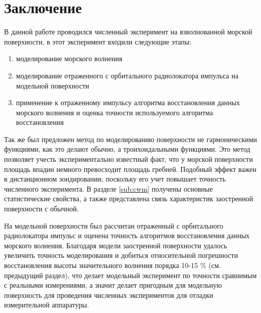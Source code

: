 \section{Заключение}%
\label{sec:zakliuchenie}

В данной работе проводился численный эксперимент на взволнованной морской
поверхности, в этот эксперимент входили следующие этапы:
\begin{enumerate}
    \item моделирование морского волнения
    \item моделирование отраженного с орбитального радиолокатора импульса на модельной поверхности
    \item применение к отраженному импульсу алгоритма восстановления данных
    морского волнения и оценка точности используемого алгоритма
    восстановления
\end{enumerate}

Так же был предложен метод по моделированию поверхности не гармоническими
функциями, как это делают обычно, а троихоидальными функциями. Это метод
позволяет учесть экспериментально известный факт, что у морской поверхности
площадь впадин немного превосходит площадь гребней. Подобный эффект важен в
дистанционном зондировании, поскольку его учет повышает точность численного
эксперимента.  В разделе \ref{sub:cwm} получены основные статистические
свойства, а также представлена связь характеристик заостренной поверхности с
обычной.


На модельной поверхности был рассчитан отраженный с орбитального радиолокатора
импульс и оценена точность алгоритмов восстановления данных морского волнения. 
Благодаря модели заостренной поверхности удалось увеличить точность
моделирования и добиться относительной погрешности восстановления высоты
значительного волнения порядка 10-15 \% (см. предыдущий раздел), что делает
модельный эксперимент по точности сравнимым с реальными измерениями, а значит
делает пригодным для модельную поверхность для проведения численных
экспериментов для отладки измерительной аппаратуры.
